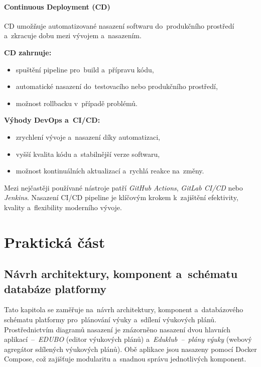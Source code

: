 \documentclass[male,czech,api_bc]{kitheses}
\begin{document}
\subsubsection{Continuous Deployment (CD)}

CD umožňuje automatizované nasazení softwaru do~produkčního prostředí a~zkracuje dobu mezi vývojem a~nasazením.

\textbf{CD zahrnuje:}
\begin{itemize}
	\item spuštění pipeline pro~build a~přípravu kódu,
	\item automatické nasazení do~testovacího nebo produkčního prostředí,
	\item možnost rollbacku v~případě problémů.
\end{itemize}

\textbf{Výhody DevOps a~CI/CD:}
\begin{itemize}
	\item zrychlení vývoje a~nasazení díky automatizaci,
	\item vyšší kvalita kódu a~stabilnější verze softwaru,
	\item možnost kontinuálních aktualizací a~rychlá reakce na~změny.
\end{itemize}

Mezi nejčastěji používané nástroje patří \textit{GitHub Actions}, \textit{GitLab CI/CD} nebo \textit{Jenkins}. Nasazení CI/CD pipeline je klíčovým krokem k~zajištění efektivity, kvality a~flexibility moderního vývoje.

\chapter{Praktická část}

\section{Návrh architektury, komponent a~schématu databáze platformy}

Tato kapitola se zaměřuje na~návrh architektury, komponent a~databázového schématu platformy pro~plánování výuky a~sdílení výukových plánů. Prostřednictvím diagramů nasazení je znázorněno nasazení dvou hlavních aplikací~--~\textit{EDUBO} (editor výukových plánů) a~\textit{Eduklub~--~plány výuky} (webový agregátor sdílených výukových plánů). Obě aplikace jsou nasazeny pomocí Docker Compose, což zajišťuje modularitu a~snadnou správu jednotlivých komponent.
\end{document}

